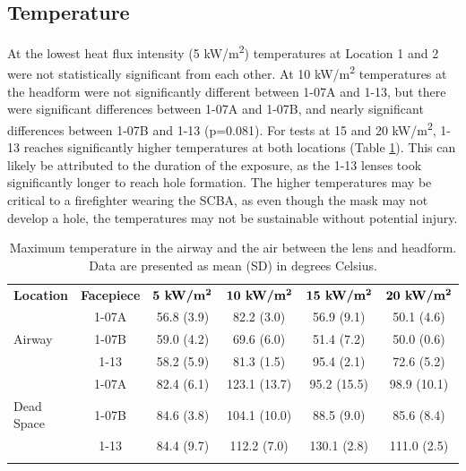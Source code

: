\documentclass[sn-mathphys]{sn-jnl}%
\theoremstyle{thmstyleone}%
\theoremstyle{thmstyletwo}%
\theoremstyle{thmstylethree}%
\begin{document}
\subsection{Temperature}\label{subsec8}
At the lowest heat flux intensity (5 kW/m\textsuperscript{2}) temperatures at Location 1 and 2 were not statistically significant from each other.  At 10 kW/m\textsuperscript{2} temperatures at the headform were not significantly different between 1-07A and 1-13, but there were significant differences between 1-07A and 1-07B, and nearly significant differences between 1-07B and 1-13 (p=0.081). For tests at 15 and 20 kW/m\textsuperscript{2}, 1-13 reaches significantly higher temperatures at both locations (Table \ref{tab3}). This can likely be attributed to the duration of the exposure, as the 1-13 lenses took significantly longer to reach hole formation. The higher temperatures may be critical to a firefighter wearing the SCBA, as even though the mask may not develop a hole, the temperatures may not be sustainable without potential injury.

\begin{table}[h!]
\begin{center}

\caption{Maximum temperature in the airway and the air between the lens and headform. Data are presented as mean (SD) in degrees Celsius.}\label{tab3}

    \begin{tabular}{lccccc}
      \toprule
      \textbf{Location} & \textbf{Facepiece} & $\textbf{5 kW/m\textsuperscript{2}}$ & $\textbf{10 kW/m\textsuperscript{2}}$ & $\textbf{15 kW/m\textsuperscript{2}}$& $\textbf{20 kW/m\textsuperscript{2}}$\\
      \botrule
      & 1-07A & 56.8 (3.9) & 82.2 (3.0) & 56.9 (9.1) & 50.1 (4.6)\\ 
      \cmidrule{2-6}
      Airway & 1-07B & 59.0 (4.2) & 69.6 (6.0) & 51.4 (7.2) & 50.0 (0.6)\\ 
      \cmidrule{2-6}
      & 1-13 & 58.2 (5.9) & 81.3 (1.5) & 95.4 (2.1) & 72.6 (5.2)\\ 
      \botrule

        & 1-07A & 82.4 (6.1) & 123.1 (13.7) & 95.2 (15.5) & 98.9 (10.1)\\ 
      \cmidrule{2-6}
      Dead Space & 1-07B & 84.6 (3.8) & 104.1 (10.0) & 88.5 (9.0) & 85.6 (8.4)\\ 
      \cmidrule{2-6}
      & 1-13 & 84.4 (9.7) & 112.2 (7.0) & 130.1 (2.8) & 111.0 (2.5) \\ 
      \botrule


     
    \end{tabular}
  
  \end{center}
\end{table}
\end{document}
